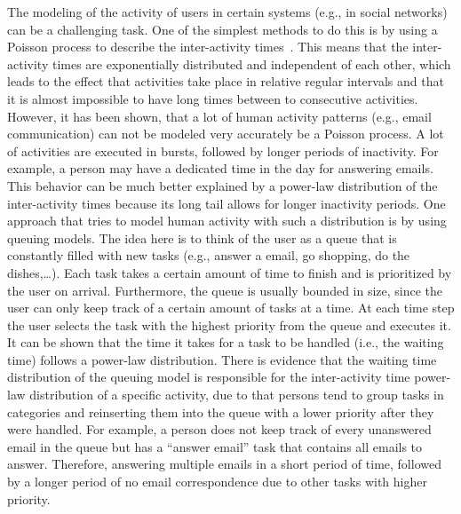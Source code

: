 The modeling of the activity of users in certain systems (e.g., in social networks) can be a challenging task.
One of the simplest methods to do this is by using a Poisson process to describe the inter-activity times~\cite{Vazquez2006}.
This means that the inter-activity times are exponentially distributed and independent of each other, which leads to the effect that activities take place in relative regular intervals and that it is almost impossible to have long times between to consecutive activities.
However, it has been shown, that a lot of human activity patterns (e.g., email communication) can not be modeled very accurately be a Poisson process.
A lot of activities are executed in bursts, followed by longer periods of inactivity.
For example, a person may have a dedicated time in the day for answering emails.
This behavior can be much better explained by a power-law distribution of the inter-activity times because its long tail allows for longer inactivity periods.
One approach that tries to model human activity with such a distribution is by using queuing models.
The idea here is to think of the user as a queue that is constantly filled with new tasks (e.g., answer a email, go shopping, do the dishes,\ldots).
Each task takes a certain amount of time to finish and is prioritized by the user on arrival.
Furthermore, the queue is usually bounded in size, since the user can only keep track of a certain amount of tasks at a time.
At each time step the user selects the task with the highest priority from the queue and executes it.
It can be shown that the time it takes for a task to be handled (i.e., the waiting time) follows a power-law distribution.
There is evidence that the waiting time distribution of the queuing model is responsible for the inter-activity time power-law distribution of a specific activity, due to that persons tend to group tasks in categories and reinserting them into the queue with a lower priority after they were handled.
For example, a person does not keep track of every unanswered email in the queue but has a \enquote{answer email} task that contains all emails to answer.
Therefore, answering multiple emails in a short period of time, followed by a longer period of no email correspondence due to other tasks with higher priority.

